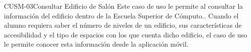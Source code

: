 \begin{UseCase}{CUSM-03}{Consultar Edificio de Salón}
    {
	Este caso de uso le permite al  consultar la información del edificio dentro de la Escuela Superior de Cómputo..
	Cuando el alumno requiera saber el número de niveles de un edificio, sus características de accesibilidad y el tipo de espacios con los que cuenta dicho edificio, el caso de uso le permite conocer esta información desde la aplicación móvil.
    }


%			


\end{UseCase}
